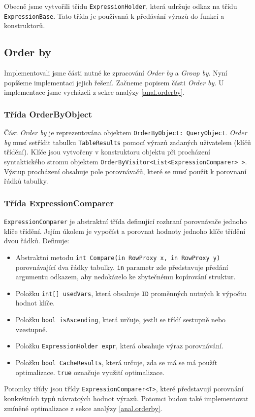 Obecně jsme vytvořili třídu \texttt{ExpressionHolder}, která udržuje odkaz na třídu \texttt{ExpressionBase}.
Tato třída je používaná k předávání výrazů do funkcí a konstruktorů.

\subsection{Order by}

Implementovali jsme části nutné ke zpracování \textit{Order by} a \textit{Group by}.
Nyní popíšeme implementaci jejich řešení.
Začneme popisem části \textit{Order by}.
U implementace jsme vycházeli z sekce analýzy \ref{anal.orderby}.

\subsubsection{Třída OrderByObject}

Část \textit{Order by} je reprezentována objektem \texttt{OrderByObject: QueryObject}.
\textit{Order by} musí setřídit tabulku \texttt{TableResults} pomocí výrazů zadaných uživatelem (klíčů třídění).
Klíče jsou vytvořeny v konstruktoru objektu při procházení syntaktického stromu objektem \texttt{OrderByVisitor<List<ExpressionComparer> >}.
Výstup procházení obsahuje pole porovnávačů, které se musí použít k porovnaní řádků tabulky.

\subsubsection{Třída ExpressionComparer}

\texttt{ExpressionComparer} je abstraktní třída definující rozhraní porovnávače jednoho klíče třídění.
Jejím úkolem je vypočíst a porovnat hodnoty jednoho klíče třídění dvou řádků.
Definuje:
\begin{itemize}
\item Abstraktní metodu \texttt{int Compare(in RowProxy x, in RowProxy y)} porovnávající dva řádky tabulky.
\texttt{in} parametr zde představuje předání argumentu odkazem, aby nedokázelo ke zbytečnému kopírování struktur.
\item Položku \texttt{int[] usedVars}, která obsahuje \texttt{ID} proměnných nutných k výpočtu hodnot klíče.
\item Položku \texttt{bool isAscending}, která určuje, jestli se třídí sestupně nebo vzestupně.
\item Položku \texttt{ExpressionHolder expr}, která obsahuje výraz porovnávání.
\item Položku \texttt{bool CacheResults}, která určuje, zda se má se má použít optimalizace.
\texttt{true} označuje využití optimalizace.

\end{itemize}
Potomky třídy jsou třídy \texttt{ExpressionComparer<T>}, které představují porovnání konkrétních typů návratoých hodnot výrazů.
Potomci budou také implementovat zmíněné optimalizace z sekce analýzy \ref{anal.orderby}.

